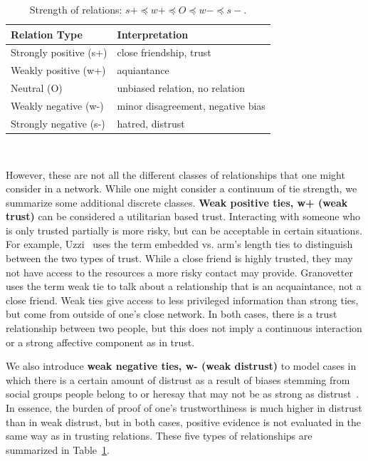 \begin{table} [htbp!]
\begin{center}
\begin{tabular}{p{1.6in}p{1.6in} }
Relation Type & Interpretation \\ \hline
Strongly positive (s+) & close friendship, trust  \\ 
Weakly positive (w+) & aquiantance \\
Neutral (O) & unbiased relation, no relation  \\
Weakly negative (w-) & minor disagreement, negative bias  \\
Strongly negative (s-) & hatred, distrust  
\end{tabular}\\\vspace{1mm}
\caption{\label{ref:rel_types} Strength of relations: $s+\preceq w+\preceq O\preceq w- \preceq s-$.}
\end{center}
\end{table}

However, these are not all the different classes of relationships that
one might consider in a network. While one might consider a continuum
of tie strength, we summarize some additional discrete classes. {\bf
  Weak positive ties, w+ (weak trust)} can be considered a utilitarian
based trust. Interacting with someone who is only trusted partially is
more risky, but can be acceptable in certain situations. For example,
Uzzi~\cite{Uzzi:1996} uses the term embedded vs. arm's length ties to
distinguish between the two types of trust. While a close friend is
highly trusted, they may not have access to the resources a more risky
contact may provide. Granovetter~\cite{Granovetter:1973} uses the term
weak tie to talk about a relationship that is an acquaintance, not a
close friend. Weak ties give access to less privileged information
than strong ties, but come from outside of one's close network. In
both cases, there is a trust relationship between two people, but this
does not imply a continuous interaction or a strong affective
component as in trust.

We also introduce {\bf weak negative ties, w- (weak distrust)} to
model cases in which there is a certain amount of distrust as a result
of biases stemming from social groups people belong to or heresay that
may not be as strong as distrust~\cite{Ames:2011}. In essence, the
burden of proof of one's trustworthiness is much higher in distrust
than in weak distrust, but in both cases, positive evidence is not
evaluated in the same way as in trusting relations. These five types
of relationships are summarized in Table~\ref{ref:rel_types}.


